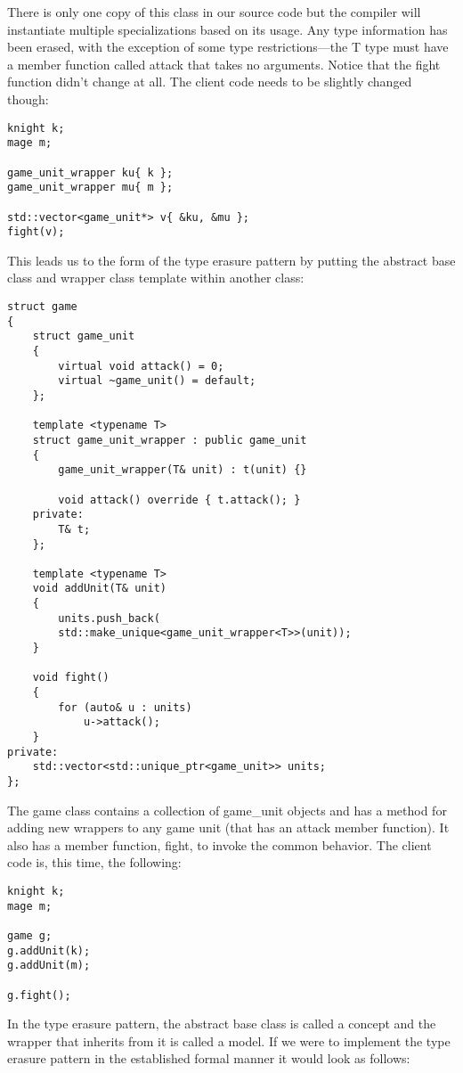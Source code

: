 There is only one copy of this class in our source code but the compiler will instantiate multiple specializations based on its usage. Any type information has been erased, with the exception of some type restrictions—the T type must have a member function called attack that takes no arguments. Notice that the fight function didn’t change at all. The client code needs to be slightly changed though:

\begin{lstlisting}[style=styleCXX]
knight k;
mage m;

game_unit_wrapper ku{ k };
game_unit_wrapper mu{ m };

std::vector<game_unit*> v{ &ku, &mu };
fight(v);
\end{lstlisting}

This leads us to the form of the type erasure pattern by putting the abstract base class and wrapper class template within another class:

\begin{lstlisting}[style=styleCXX]
struct game
{
	struct game_unit
	{
		virtual void attack() = 0;
		virtual ~game_unit() = default;
	};

	template <typename T>
	struct game_unit_wrapper : public game_unit
	{
		game_unit_wrapper(T& unit) : t(unit) {}
		
		void attack() override { t.attack(); }
	private:
		T& t;
	};

	template <typename T>
	void addUnit(T& unit)
	{
		units.push_back(
		std::make_unique<game_unit_wrapper<T>>(unit));
	}

	void fight()
	{
		for (auto& u : units)
			u->attack();
	}
private:
	std::vector<std::unique_ptr<game_unit>> units;
};
\end{lstlisting}

The game class contains a collection of game\_unit objects and has a method for adding new wrappers to any game unit (that has an attack member function). It also has a member function, fight, to invoke the common behavior. The client code is, this time, the following:

\begin{lstlisting}[style=styleCXX]
knight k;
mage m;

game g;
g.addUnit(k);
g.addUnit(m);

g.fight();
\end{lstlisting}

In the type erasure pattern, the abstract base class is called a concept and the wrapper that inherits from it is called a model. If we were to implement the type erasure pattern in the established formal manner it would look as follows:

